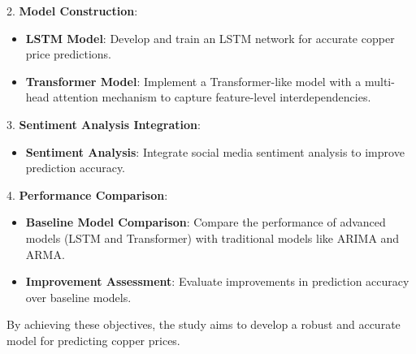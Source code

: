 \documentclass[project-plan]{report-template}
\begin{document}
2. \textbf{Model Construction}:
   \begin{itemize}
      \item \textbf{LSTM Model}: Develop and train an LSTM network for accurate copper price predictions.
      \item \textbf{Transformer Model}: Implement a Transformer-like model with a multi-head attention mechanism to capture feature-level interdependencies.
   \end{itemize}

3. \textbf{Sentiment Analysis Integration}:
   \begin{itemize}
      \item \textbf{Sentiment Analysis}: Integrate social media sentiment analysis to improve prediction accuracy.
   \end{itemize}

4. \textbf{Performance Comparison}:
   \begin{itemize}
      \item \textbf{Baseline Model Comparison}: Compare the performance of advanced models (LSTM and Transformer) with traditional models like ARIMA and ARMA.
      \item \textbf{Improvement Assessment}: Evaluate improvements in prediction accuracy over baseline models.
   \end{itemize}

By achieving these objectives, the study aims to develop a robust and accurate model for predicting copper prices.
\end{document}
